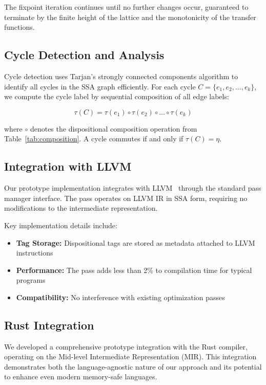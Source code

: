 \documentclass[journal]{IEEEtran}
\begin{document}
The fixpoint iteration continues until no further changes occur, guaranteed to terminate by the finite height of the lattice and the monotonicity of the transfer functions.

\subsection{Cycle Detection and Analysis}

Cycle detection uses Tarjan's strongly connected components algorithm to identify all cycles in the SSA graph efficiently. For each cycle $C = \{e_1, e_2, \ldots, e_k\}$, we compute the cycle label by sequential composition of all edge labels:

\begin{equation}
\tau(C) = \tau(e_1) \circ \tau(e_2) \circ \ldots \circ \tau(e_k)
\end{equation}

where $\circ$ denotes the dispositional composition operation from Table~\ref{tab:composition}. A cycle commutes if and only if $\tau(C) = \eta$.

\subsection{Integration with LLVM}

Our prototype implementation integrates with LLVM~\cite{lattner2004llvm} through the standard pass manager interface. The pass operates on LLVM IR in SSA form, requiring no modifications to the intermediate representation.

Key implementation details include:

\begin{itemize}
\item \textbf{Tag Storage:} Dispositional tags are stored as metadata attached to LLVM instructions
\item \textbf{Performance:} The pass adds less than 2\% to compilation time for typical programs
\item \textbf{Compatibility:} No interference with existing optimization passes
\end{itemize}

\subsection{Rust Integration}

We developed a comprehensive prototype integration with the Rust compiler, operating on the Mid-level Intermediate Representation (MIR). This integration demonstrates both the language-agnostic nature of our approach and its potential to enhance even modern memory-safe languages.
\end{document}

